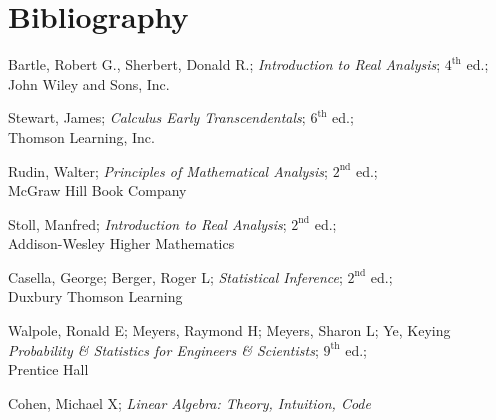 \section{Bibliography}

\begin{thebibliography}{9}
Bartle, Robert G., Sherbert, Donald R.; \textit{Introduction to Real Analysis}; $4^{\text{th}}$ ed.;\\ John Wiley and Sons, Inc.

Stewart, James; \textit{Calculus Early Transcendentals}; $6^{\text{th}}$ ed.;\\ Thomson Learning, Inc.

Rudin, Walter; \textit{Principles of Mathematical Analysis}; $2^{\text{nd}}$ ed.;\\ McGraw Hill Book Company

Stoll, Manfred; \textit{Introduction to Real Analysis}; $2^{\text{nd}}$ ed.;\\ Addison-Wesley Higher Mathematics

Casella, George; Berger, Roger L; \textit{Statistical Inference}; $2^{\text{nd}}$ ed.;\\ Duxbury Thomson Learning

Walpole, Ronald E; Meyers, Raymond H; Meyers, Sharon L; Ye, Keying \textit{Probability \& Statistics for Engineers \& Scientists}; $9^{\text{th}}$ ed.;\\ Prentice Hall

Cohen, Michael X; \textit{Linear Algebra: Theory, Intuition, Code}

\end{thebibliography}